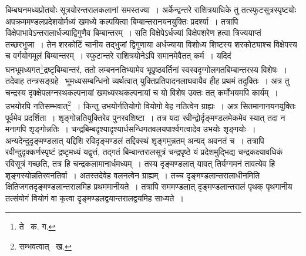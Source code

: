 \documentclass[11pt, openany]{book}
\begin{document}
\noindent बिम्बघनमध्यप्रोतयोः सूत्रयोरन्तरालकलानां समस्तज्या~। अर्केन्द्वन्तरे राशित्रयाधिके तु तत्स्फुटसूत्रस्पृष्टयोः अपक्रममण्डलप्रदेशयोर्मध्यं खमध्ये कल्पयित्वा बिम्बान्तरानयनयुक्तिः प्रदर्श्या~। तत्रापि विक्षेपाभावेऽन्तरालार्धज्याद्विगुणैव बिम्बान्तरम्~। सति विक्षेपेऽर्धज्यां विक्षेपशरेण हत्वा त्रिज्ययाप्तं तच्छरभुजा~। तेन शरकोटिं चानीय तद्भुजां द्विगुणाया अर्धज्याया विशोध्य शिष्टस्य शरकोट्याश्च विक्षेपस्य च वर्गयोगमूलं बिम्बान्तरम्~। स्फुटान्तरे राशित्रयोनेऽपि समानमेवैतत् कर्म~। यदिदं घनभूमध्यगत\renewcommand{\thefootnote}{१}\footnote{ ते \textendash\ क. ग.}द्रष्टृबिम्बान्तरं, ततो लम्बननतिभ्यामेव भूपृष्ठवर्तिनां स्वस्वदृग्गोलगतबिम्बान्तरस्य विशेषः~। तदेवाह तन्त्रसङ्ग्रहे \textendash\ {\qt भूमध्यसम्बन्धिनो व्यर्थत्वात् युक्तिप्रतिपादनलाघवायैव हीह प्रथमं
तदुक्तिः}~। अत्र तु चन्द्रस्य दृक्क्षेपलग्नस्थकल्पनायां खमध्यस्थकल्पनायां च यो विशेष उक्तः तत् कर्मोभयमपि कार्यम्~। उभयोरपि नतिसम्भवात्\renewcommand{\thefootnote}{२}\footnote{सम्भवत्वात् \textendash\ ख.}~। किन्तु उभयोर्नतियोगो वियोगो वेह नतित्वेन ग्राह्यः~। अत्र सितमानानयनयुक्तिः पूर्वमेव प्रदर्शिता~। शृङ्गोन्नतियुक्तिरेव पुनरवशिष्टा~। तत्र यदा रवीन्द्वोर्दृङ्मण्डलमेकमेव स्यात् तदा न मनागपि शृङ्गोन्नतिः~। चन्द्रबिम्बदृश्यादृश्यार्धसन्धिगतवलयपार्श्वगत्वादेव उभयोः शृङ्गयोः~। अन्यदेन्दुदृङ्मण्डलात् यद्दिशि रविदृङ्मण्डलं तद्दिक्स्थं शृङ्गमुन्नतम्
अन्यद् अवनतं च~। तत्रापि रवीन्दुदृक्कर्णस्पृष्टं द्रष्टृमध्यं यद्वृत्तं, तद्गतं बिम्बान्तरालसूत्रं चन्द्रपृष्ठे यं प्रदेशमुद्भिद्य चन्द्रकक्ष्यावधिकं रविसूत्रं
गच्छति, तत्र हि चन्द्रकलामानार्धमध्यम्~। तस्य दृङ्मण्डलात् यावत् तिर्यग्गमनं तावत्येव हि शृङ्गस्योन्नतिरवनतिर्वा~। अतस्तदेवेह वलनत्वेन
ग्राह्यम्~। तच्च दृङ्मण्डलान्तरालाधीनमिति क्षितिजगतदृङ्मण्डलान्तरालमिह प्रथममानीयते~। तत्रापि सममण्डलात् दृङ्मण्डलान्तरालं पृथक् पृथगानीय
तत्संयोगं वियोगं वा कृत्वा दृङ्मण्डलद्वयान्तरालद्वयमिह साध्यते~।

\newpage
\end{document}
